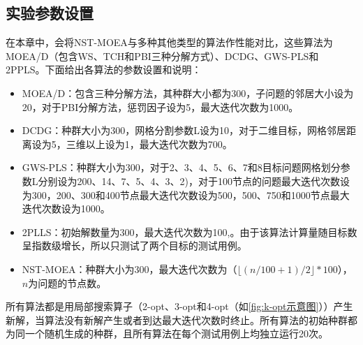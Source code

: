 \subsection{实验参数设置}
\label{subsec:NST:实验与讨论:实验参数设置}
在本章中，会将NST-MOEA与多种其他类型的算法作性能对比，这些算法为MOEA/D（包含WS、TCH和PBI三种分解方式）\cite{zhang2007moea}、DCDG\cite{cai2019collaborative}、GWS-PLS\cite{cai2018grid}和2PPLS\cite{lust2010speed}。下面给出各算法的参数设置和说明：
\begin{itemize}
    \item MOEA/D：包含三种分解方法，其种群大小都为300，子问题的邻居大小设为20，对于PBI分解方法，惩罚因子设为5，最大迭代次数为1000。
    \item DCDG：种群大小为300，网格分割参数L设为10，对于二维目标，网格邻居距离设为5，三维以上设为1，最大迭代次数为700。
    \item GWS-PLS：种群大小为300，对于2、3、4、5、6、7和8目标问题网格划分参数L分别设为200、14、7、5、4、3、2)，对于100节点的问题最大迭代次数设为300，200、300和400节点最大迭代次数设为500，500、750和1000节点最大迭代次数设为1000。
    \item 2PLLS：初始解数量为300，最大迭代次数为100,。由于该算法计算量随目标数呈指数级增长\cite{lust2012multiobjective}，所以只测试了两个目标的测试用例。
    \item NST-MOEA：种群大小为300，最大迭代次数为（$\lfloor (n/100+1)/2 \rfloor * 100$），$n$为问题的节点数。
\end{itemize}
所有算法都是用局部搜索算子（2-opt、3-opt和4-opt（如\ref{fig:k-opt示意图}））产生新解，当算法没有新解产生或者到达最大迭代次数时终止。所有算法的初始种群都为同一个随机生成的种群，且所有算法在每个测试用例上均独立运行20次。

